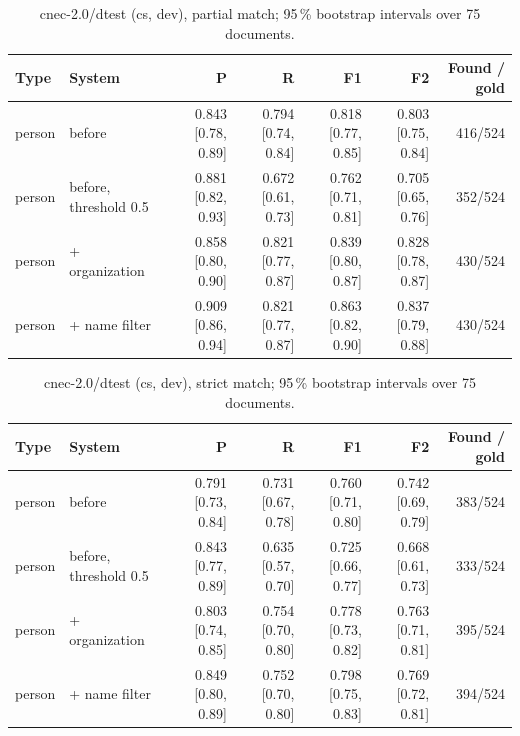 \providecommand{\ci}[2]{{\scriptsize [#1, #2]}}

\begin{table}[htbp]
\centering
\small
\begin{tabular}{llrrrrr}
\toprule
Type & System & P & R & F1 & F2 & Found / gold \\
\midrule
person & before & 0.843 \ci{0.78}{0.89} & 0.794 \ci{0.74}{0.84} & 0.818 \ci{0.77}{0.85} & 0.803 \ci{0.75}{0.84} & 416/524 \\
person & before, threshold 0.5 & 0.881 \ci{0.82}{0.93} & 0.672 \ci{0.61}{0.73} & 0.762 \ci{0.71}{0.81} & 0.705 \ci{0.65}{0.76} & 352/524 \\
person & + organization & 0.858 \ci{0.80}{0.90} & 0.821 \ci{0.77}{0.87} & 0.839 \ci{0.80}{0.87} & 0.828 \ci{0.78}{0.87} & 430/524 \\
person & + name filter & 0.909 \ci{0.86}{0.94} & 0.821 \ci{0.77}{0.87} & 0.863 \ci{0.82}{0.90} & 0.837 \ci{0.79}{0.88} & 430/524 \\
\bottomrule
\end{tabular}
\caption{cnec-2.0/dtest (cs, dev), partial match; 95\,\% bootstrap intervals over 75 documents.}
\label{tab:gliner-sweep-cnec-2.0-dtest-partial}
\end{table}

\begin{table}[htbp]
\centering
\small
\begin{tabular}{llrrrrr}
\toprule
Type & System & P & R & F1 & F2 & Found / gold \\
\midrule
person & before & 0.791 \ci{0.73}{0.84} & 0.731 \ci{0.67}{0.78} & 0.760 \ci{0.71}{0.80} & 0.742 \ci{0.69}{0.79} & 383/524 \\
person & before, threshold 0.5 & 0.843 \ci{0.77}{0.89} & 0.635 \ci{0.57}{0.70} & 0.725 \ci{0.66}{0.77} & 0.668 \ci{0.61}{0.73} & 333/524 \\
person & + organization & 0.803 \ci{0.74}{0.85} & 0.754 \ci{0.70}{0.80} & 0.778 \ci{0.73}{0.82} & 0.763 \ci{0.71}{0.81} & 395/524 \\
person & + name filter & 0.849 \ci{0.80}{0.89} & 0.752 \ci{0.70}{0.80} & 0.798 \ci{0.75}{0.83} & 0.769 \ci{0.72}{0.81} & 394/524 \\
\bottomrule
\end{tabular}
\caption{cnec-2.0/dtest (cs, dev), strict match; 95\,\% bootstrap intervals over 75 documents.}
\label{tab:gliner-sweep-cnec-2.0-dtest-strict}
\end{table}

